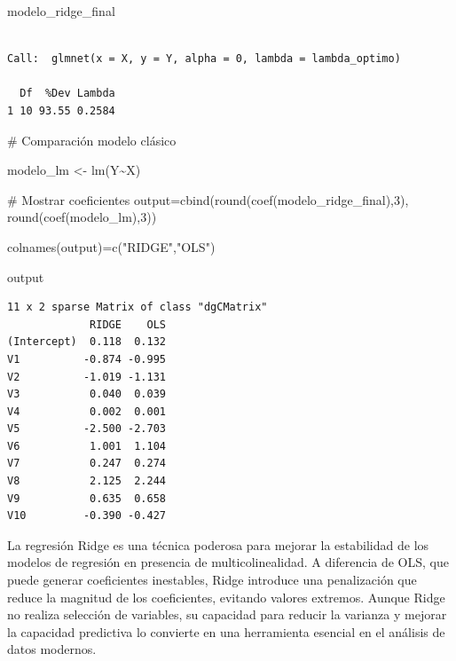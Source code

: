 \documentclass[
  letterpaper,
  DIV=11,
  numbers=noendperiod]{scrreprt}
\newenvironment{Shaded}{\begin{snugshade}}{\end{snugshade}}
\newcommand{\CommentTok}[1]{\textcolor[rgb]{0.37,0.37,0.37}{#1}}
\newcommand{\DecValTok}[1]{\textcolor[rgb]{0.68,0.00,0.00}{#1}}
\newcommand{\FunctionTok}[1]{\textcolor[rgb]{0.28,0.35,0.67}{#1}}
\newcommand{\NormalTok}[1]{\textcolor[rgb]{0.00,0.23,0.31}{#1}}
\newcommand{\OtherTok}[1]{\textcolor[rgb]{0.00,0.23,0.31}{#1}}
\newcommand{\SpecialCharTok}[1]{\textcolor[rgb]{0.37,0.37,0.37}{#1}}
\newcommand{\StringTok}[1]{\textcolor[rgb]{0.13,0.47,0.30}{#1}}
\begin{document}
\begin{tcolorbox}
\begin{Shaded}
\begin{Highlighting}[]
\NormalTok{modelo\_ridge\_final}
\end{Highlighting}
\end{Shaded}

\begin{verbatim}

Call:  glmnet(x = X, y = Y, alpha = 0, lambda = lambda_optimo) 

  Df  %Dev Lambda
1 10 93.55 0.2584
\end{verbatim}

\begin{Shaded}
\begin{Highlighting}[]
\CommentTok{\# Comparación modelo clásico}

\NormalTok{modelo\_lm }\OtherTok{\textless{}{-}} \FunctionTok{lm}\NormalTok{(Y}\SpecialCharTok{\textasciitilde{}}\NormalTok{X)}

\CommentTok{\# Mostrar coeficientes}
\NormalTok{output}\OtherTok{=}\FunctionTok{cbind}\NormalTok{(}\FunctionTok{round}\NormalTok{(}\FunctionTok{coef}\NormalTok{(modelo\_ridge\_final),}\DecValTok{3}\NormalTok{),}
            \FunctionTok{round}\NormalTok{(}\FunctionTok{coef}\NormalTok{(modelo\_lm),}\DecValTok{3}\NormalTok{))}

\FunctionTok{colnames}\NormalTok{(output)}\OtherTok{=}\FunctionTok{c}\NormalTok{(}\StringTok{"RIDGE"}\NormalTok{,}\StringTok{"OLS"}\NormalTok{)}

\NormalTok{output}
\end{Highlighting}
\end{Shaded}

\begin{verbatim}
11 x 2 sparse Matrix of class "dgCMatrix"
             RIDGE    OLS
(Intercept)  0.118  0.132
V1          -0.874 -0.995
V2          -1.019 -1.131
V3           0.040  0.039
V4           0.002  0.001
V5          -2.500 -2.703
V6           1.001  1.104
V7           0.247  0.274
V8           2.125  2.244
V9           0.635  0.658
V10         -0.390 -0.427
\end{verbatim}

\end{tcolorbox}

La regresión Ridge es una técnica poderosa para mejorar la estabilidad
de los modelos de regresión en presencia de multicolinealidad. A
diferencia de OLS, que puede generar coeficientes inestables, Ridge
introduce una penalización que reduce la magnitud de los coeficientes,
evitando valores extremos. Aunque Ridge no realiza selección de
variables, su capacidad para reducir la varianza y mejorar la capacidad
predictiva lo convierte en una herramienta esencial en el análisis de
datos modernos.
\end{document}
